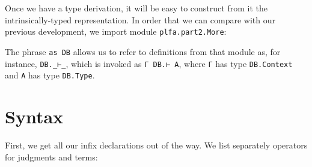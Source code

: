 Once we have a type derivation, it will be easy to construct from it the
intrinsically-typed representation. In order that we can compare with
our previous development, we import module \texttt{plfa.part2.More}:

\begin{fence}
\begin{code}%
\>[0]\AgdaSpace{}%
\AgdaSpace{}%
\AgdaSpace{}%
\<%
\end{code}
\end{fence}

The phrase \texttt{as\ DB} allows us to refer to definitions from that
module as, for instance, \texttt{DB.\_⊢\_}, which is invoked as
\texttt{Γ\ DB.⊢\ A}, where \texttt{Γ} has type \texttt{DB.Context} and
\texttt{A} has type \texttt{DB.Type}.

\hypertarget{syntax}{%
\section{Syntax}\label{syntax}}

First, we get all our infix declarations out of the way. We list
separately operators for judgments and terms:

